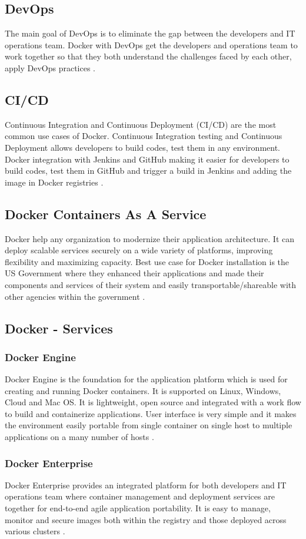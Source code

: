 \documentclass[sigconf]{acmart}
\begin{document}
	\subsection{DevOps}
	The main goal of DevOps is to eliminate the gap between the developers and IT operations team. Docker with DevOps get the developers and operations team to work together so that they both understand the challenges faced by each other, apply DevOps practices \cite{hackernoon}.
	\subsection{CI/CD}
	Continuous Integration and Continuous Deployment (CI/CD) are the most common use cases of Docker. Continuous Integration testing and Continuous Deployment allows developers to build codes, test them in any environment. Docker integration with Jenkins and GitHub making it easier for developers to build codes, test them in GitHub and trigger a build in Jenkins and adding the image in Docker registries \cite{hackernoon}.
	\subsection{Docker Containers As A Service}
	Docker help any organization to  modernize their application architecture. It can deploy scalable services securely on a wide variety of platforms, improving flexibility and maximizing capacity. Best use case for Docker installation is the US Government where they enhanced their applications and made their components and services of their system and easily transportable/shareable with other agencies within the government \cite{hackernoon}.
	
	\subsection{Docker - Services}
	\subsubsection{Docker Engine}
	Docker Engine is the foundation for the application platform which is used for creating and running Docker containers. It is supported on Linux, Windows, Cloud and Mac OS. It is lightweight, open source and integrated with a work flow to build and containerize applications. User interface is very simple and it makes the environment easily portable from single container on single host to multiple applications on a many number of hosts \cite{hackernoon}.
	\subsubsection{Docker Enterprise}
	Docker Enterprise provides an integrated platform for both developers and IT operations team where container management and deployment services are together for end-to-end agile application portability. It is easy to manage, monitor and secure images both within the registry and those deployed across various clusters \cite{hackernoon}.
\end{document}

